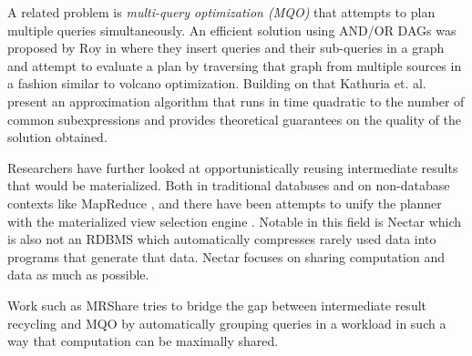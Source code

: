 A related problem is \emph{multi-query optimization (MQO)}
\cite{theodoratosDataWarehouseConfiguration1997} that attempts to plan
multiple queries simultaneously. An efficient solution using AND/OR
DAGs was proposed by Roy in
\cite{royEfficientExtensibleAlgorithms2000} where they insert queries
and their sub-queries in a graph and attempt to evaluate a plan by
traversing that graph from multiple sources in a fashion similar to
volcano optimization. Building on that Kathuria
et. al. \cite{kathuriaEfficientProvableMultiquery2017} present an
approximation algorithm that runs in time quadratic to the number of
common subexpressions and provides theoretical guarantees on the
quality of the solution obtained.

Researchers have further looked at opportunistically reusing
intermediate results that would be materialized. Both in traditional
databases
\cite{ivanovaArchitectureRecyclingIntermediates2010,nagelRecyclingPipelinedQuery2013}
and on non-database contexts like MapReduce
\cite{elghandourReStoreReusingResults2012a}, and there have been
attempts to unify the planner with the materialized view selection
engine \cite{perezHistoryawareQueryOptimization2014a}. Notable in this
field is Nectar \cite{gundaNectarAutomaticManagement2010} which is
also not an RDBMS which automatically compresses rarely used data into
programs that generate that data. Nectar focuses on sharing
computation and data as much as possible.

Work such as MRShare \cite{nykielMRShareSharingMultiple2010} tries to
bridge the gap between intermediate result recycling and MQO by
automatically grouping queries in a workload in such a way that
computation can be maximally shared.



